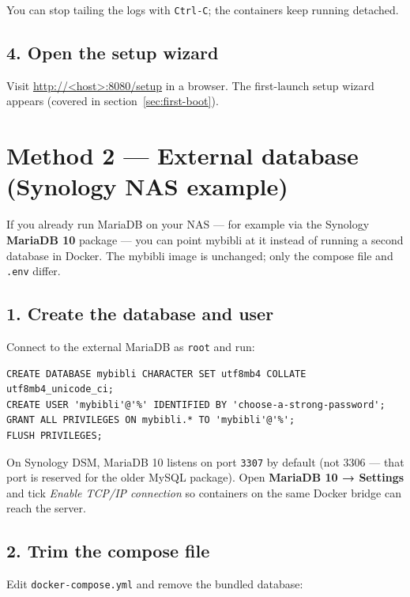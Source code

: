 You can stop tailing the logs with \texttt{Ctrl-C}; the containers
keep running detached.

\subsection*{4. Open the setup wizard}

Visit \url{http://<host>:8080/setup} in a browser. The first-launch
setup wizard appears (covered in
section~\ref{sec:first-boot}).

\section{Method 2 — External database (Synology NAS example)}\label{sec:install-external-db}

If you already run MariaDB on your NAS — for example via the Synology
\textbf{MariaDB 10} package — you can point mybibli at it instead of
running a second database in Docker. The mybibli image is unchanged;
only the compose file and \texttt{.env} differ.

\subsection*{1. Create the database and user}

Connect to the external MariaDB as \texttt{root} and run:

\begin{lstlisting}
CREATE DATABASE mybibli CHARACTER SET utf8mb4 COLLATE utf8mb4_unicode_ci;
CREATE USER 'mybibli'@'%' IDENTIFIED BY 'choose-a-strong-password';
GRANT ALL PRIVILEGES ON mybibli.* TO 'mybibli'@'%';
FLUSH PRIVILEGES;
\end{lstlisting}

\begin{note}
On Synology DSM, MariaDB 10 listens on port \texttt{3307} by default
(not 3306 — that port is reserved for the older MySQL package). Open
\textbf{MariaDB 10 → Settings} and tick \emph{Enable TCP/IP
connection} so containers on the same Docker bridge can reach the
server.
\end{note}

\subsection*{2. Trim the compose file}

Edit \texttt{docker-compose.yml} and remove the bundled database:

